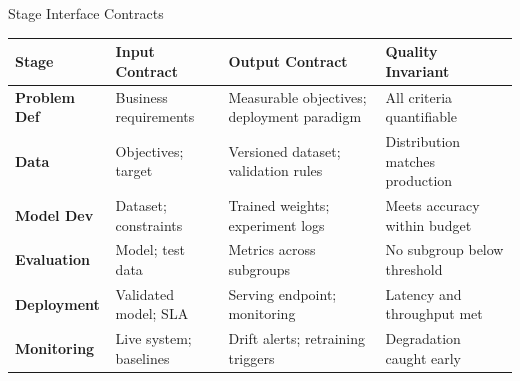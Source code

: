 \documentclass[aspectratio=169, 12pt]{beamer}
\begin{document}
\begin{frame}{Stage Interface Contracts}
\note{
%
%
%
%
}

\scriptsize
\renewcommand{\arraystretch}{0.95}
\begin{tabular}{@{}lp{2.8cm}p{3.3cm}p{3.3cm}@{}}
  \toprule
  \textbf{Stage} & \textbf{Input Contract} & \textbf{Output Contract} & \textbf{Quality Invariant} \\
  \midrule
  \textbf{Problem Def}  & Business requirements & Measurable objectives; deployment paradigm & All criteria quantifiable \\
  \textbf{Data}          & Objectives; target    & Versioned dataset; validation rules        & Distribution matches production \\
  \textbf{Model Dev}     & Dataset; constraints  & Trained weights; experiment logs            & Meets accuracy within budget \\
  \textbf{Evaluation}    & Model; test data      & Metrics across subgroups                   & No subgroup below threshold \\
  \textbf{Deployment}    & Validated model; SLA  & Serving endpoint; monitoring               & Latency and throughput met \\
  \textbf{Monitoring}    & Live system; baselines & Drift alerts; retraining triggers          & Degradation caught early \\
  \bottomrule
\end{tabular}

\vspace{0.05cm}
\small
{}

\end{frame}
\end{document}
